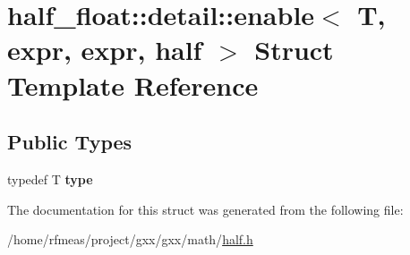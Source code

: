 \hypertarget{structhalf__float_1_1detail_1_1enable_3_01T_00_01expr_00_01expr_00_01half_01_4}{}\section{half\+\_\+float\+:\+:detail\+:\+:enable$<$ T, expr, expr, half $>$ Struct Template Reference}
\label{structhalf__float_1_1detail_1_1enable_3_01T_00_01expr_00_01expr_00_01half_01_4}
\subsection*{Public Types}
\begin{DoxyCompactItemize}
\item 
typedef T {\bfseries type}\hypertarget{structhalf__float_1_1detail_1_1enable_3_01T_00_01expr_00_01expr_00_01half_01_4_a9d90de126a82e576c9f3e025c6de7bd3}{}\label{structhalf__float_1_1detail_1_1enable_3_01T_00_01expr_00_01expr_00_01half_01_4_a9d90de126a82e576c9f3e025c6de7bd3}

\end{DoxyCompactItemize}


The documentation for this struct was generated from the following file\+:\begin{DoxyCompactItemize}
\item 
/home/rfmeas/project/gxx/gxx/math/\hyperlink{half_8h}{half.\+h}\end{DoxyCompactItemize}
